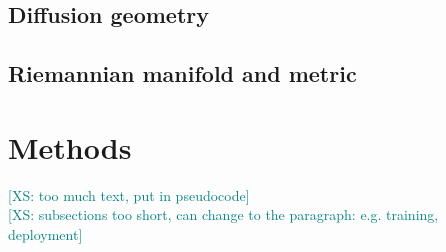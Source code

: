 \documentclass{article}
\theoremstyle{plain}
\theoremstyle{definition}
\theoremstyle{remark}
\newcommand{\xin}[1]{\textcolor{teal}{[XS: #1]}}
\begin{document}
\subsection{Diffusion geometry}

\subsection{Riemannian manifold and metric}





\section{Methods}
\xin{too much text, put in pseudocode}\\
\xin{subsections too short, can change to the paragraph: e.g. training, deployment}\\
\end{document}
